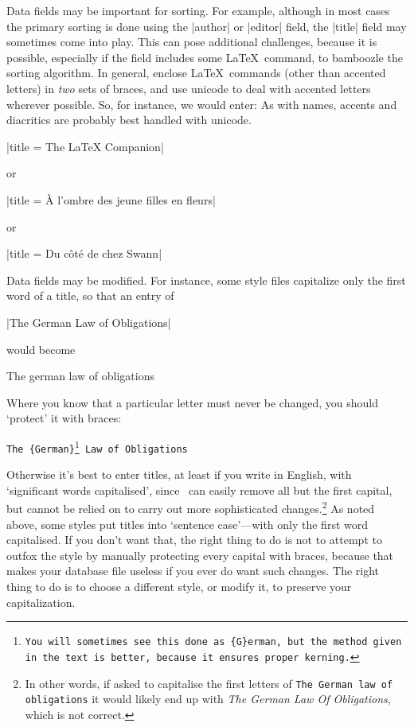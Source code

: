 Data fields may be important for sorting. For example, although in
most cases the primary sorting is done using the |author| or |editor|
field, the |title| field may sometimes come into play. This can pose
additional challenges, because it is possible, especially if the field
includes some \LaTeX\ command, to bamboozle the sorting algorithm. In
general, enclose \LaTeX\ commands (other than accented letters) in
\emph{two} sets of braces, and use unicode to deal with accented
letters wherever possible. So, for instance, we would
enter: As with names,
accents and diacritics are probably best handled with unicode.
\begin{center}
|title = {The {{\LaTeX}} Companion}|

or

|title = {{\`A} l'ombre des jeune filles en fleurs}|

or

|title = {Du côté de chez Swann}|
\end{center}

Data fields may be modified. For instance, some style files capitalize
only the first word of a title, so that an entry of
\begin{center}
|The German Law of Obligations|
\end{center}
would become
\begin{center}
The german law of obligations
\end{center}
Where you know that a particular letter must never be changed, you should `protect' it with braces:
\begin{center}
\texttt{The \{German\}\footnote{You will sometimes see this done as \texttt{\{G\}erman}, but the method given in the text is better, because it ensures proper kerning.} Law of Obligations}
\end{center}
Otherwise it's best to enter titles, at least if you write in English,
with `significant words capitalised', since \biblatex\ can easily
remove all but the first capital, but cannot be relied on to carry out
more sophisticated changes.\footnote{In other words, if asked to
  capitalise the first letters of \texttt{The German law of
    obligations} it would likely end up with \emph{The German Law Of
    Obligations}, which is not correct.} As noted above, some styles
put titles into `sentence case'---with only the first word
capitalised. If you don't want that, the right thing to do is not to
attempt to outfox the style by manually protecting every capital with
braces, because that makes your database file useless if you ever do
want such changes. The right thing to do is to choose a different
style, or modify it, to preserve your capitalization.

